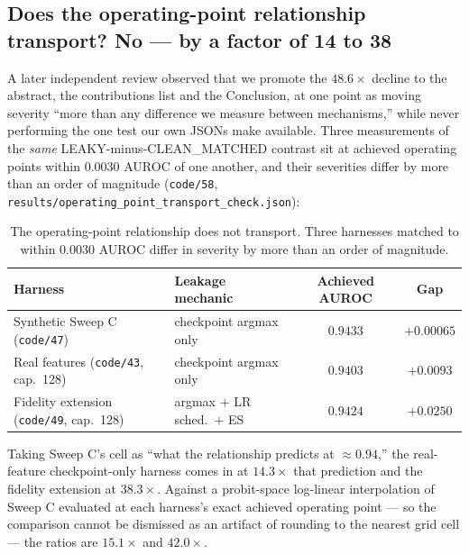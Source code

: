 \documentclass[10pt]{article} %
\begin{document}
\subsection{Does the operating-point relationship transport? No --- by a factor of 14 to 38}

A later independent review observed that we promote the $48.6\times$ decline
to the abstract, the contributions list and the Conclusion, at one point as
moving severity ``more than any difference we measure between mechanisms,''
while never performing the one test our own JSONs make available. Three
measurements of the \emph{same} LEAKY-minus-CLEAN\_MATCHED contrast sit at
achieved operating points within $0.0030$ AUROC of one another, and their
severities differ by more than an order of magnitude (\texttt{code/58},
\texttt{results/operating\_point\_transport\_check.json}):

\begin{table}[h]
\centering
\small
\begin{tabular}{llcc}
\toprule
Harness & Leakage mechanic & Achieved AUROC & Gap \\
\midrule
Synthetic Sweep C (\texttt{code/47}) & checkpoint argmax only & $0.9433$ & $+0.00065$ \\
Real features (\texttt{code/43}, cap.\ 128) & checkpoint argmax only & $0.9403$ & $+0.0093$ \\
Fidelity extension (\texttt{code/49}, cap.\ 128) & argmax $+$ LR sched.\ $+$ ES & $0.9424$ & $+0.0250$ \\
\bottomrule
\end{tabular}
\caption{The operating-point relationship does not transport. Three harnesses
matched to within $0.0030$ AUROC differ in severity by more than an order of
magnitude.}
\end{table}

Taking Sweep C's cell as ``what the relationship predicts at $\approx0.94$,''
the real-feature checkpoint-only harness comes in at $\mathbf{14.3\times}$
that prediction and the fidelity extension at $\mathbf{38.3\times}$. Against a
probit-space log-linear interpolation of Sweep C evaluated at each harness's
exact achieved operating point --- so the comparison cannot be dismissed as an
artifact of rounding to the nearest grid cell --- the ratios are $15.1\times$
and $42.0\times$.
\end{document}
